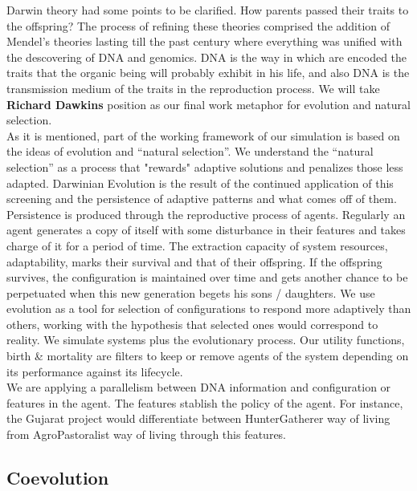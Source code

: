 \documentclass[11pt,oneside,a4paper,openright]{report}
\begin{document}
Darwin theory had some points to be clarified. How parents passed their traits to the offspring?
The process of refining these theories comprised the addition of Mendel's theories lasting till 
the past century where everything was unified with the descovering of DNA and genomics. DNA is the 
way in which are encoded the traits that the organic being will probably exhibit in his life, and 
also DNA is the transmission medium of the traits in the reproduction process. We will take \textbf{Richard Dawkins} 
position as our final work metaphor for evolution and natural selection\cite{Dawkins1990}.\\ 
As it is mentioned, part of the working framework of our simulation is based on the ideas of evolution and ``natural selection''. We understand the ``natural selection'' as a process that "rewards" adaptive solutions and penalizes those less adapted. Darwinian Evolution is the result of the continued application of this screening and the persistence of adaptive patterns and what comes off of them. Persistence is produced through the reproductive process of agents. Regularly an agent generates a copy of itself with some disturbance in their features and takes charge of it for a period of time. The extraction capacity of system resources, adaptability,  marks their survival and that of their offspring. If the offspring survives, the configuration is maintained over time and gets another chance to be perpetuated when this new generation begets his sons / daughters. We use evolution as a tool for selection of configurations to respond more adaptively than others, working with the hypothesis that selected ones would correspond to reality. We simulate systems plus the evolutionary process. Our utility functions, birth \& mortality are filters to keep or remove agents of the system depending on its performance against its lifecycle.\\ 
We are applying a parallelism between DNA information and configuration or features in the agent. The features stablish
the policy of the agent. For instance, the Gujarat project would differentiate between HunterGatherer way of living from AgroPastoralist way of living through this features.

\subsection{Coevolution}
\end{document}
